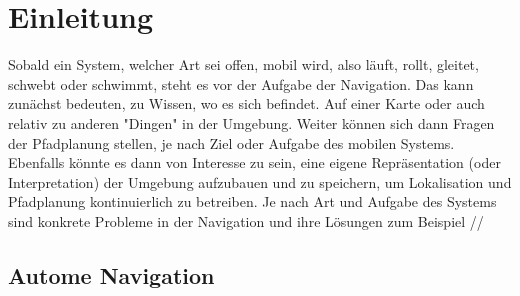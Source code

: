 %


\chapter{Einleitung}


Sobald ein System, welcher Art sei offen, mobil wird, also läuft, rollt, gleitet, schwebt oder schwimmt, steht es vor der Aufgabe der Navigation. Das kann zunächst bedeuten, zu Wissen, wo es sich befindet. Auf einer Karte oder auch relativ zu anderen "Dingen"  in der Umgebung. Weiter können sich dann Fragen der Pfadplanung stellen, je nach Ziel oder Aufgabe des mobilen Systems. Ebenfalls könnte es dann von Interesse zu sein, eine eigene Repräsentation (oder Interpretation) der Umgebung aufzubauen und zu speichern, um Lokalisation und Pfadplanung kontinuierlich zu betreiben. Je nach Art und Aufgabe des Systems sind konkrete Probleme in der Navigation und ihre Lösungen zum Beispiel  // 

\section{Autome Navigation}



